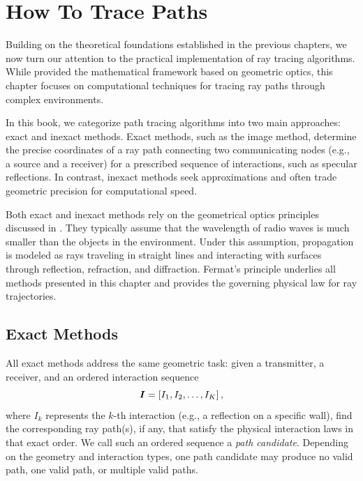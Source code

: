 \chapter{How To Trace Paths}

Building on the theoretical foundations established in the previous chapters, we now turn our attention to the practical implementation of ray tracing algorithms. While  provided the mathematical framework based on geometric optics, this chapter focuses on computational techniques for tracing ray paths through complex environments.

In this book, we categorize path tracing algorithms into two main approaches: exact and inexact methods. Exact methods, such as the image method, determine the precise coordinates of a ray path connecting two communicating nodes (e.g., a source and a receiver) for a prescribed sequence of interactions, such as specular reflections. In contrast, inexact methods seek approximations and often trade geometric precision for computational speed.

Both exact and inexact methods rely on the geometrical optics principles discussed in . They typically assume that the \gls{wavelength} of radio waves is much smaller than the objects in the environment. Under this assumption, propagation is modeled as rays traveling in straight lines and interacting with surfaces through reflection, refraction, and diffraction. Fermat's principle underlies all methods presented in this chapter and provides the governing physical law for ray trajectories.

\section{Exact Methods}

All exact methods address the same geometric task: given a transmitter, a receiver, and an ordered interaction sequence
\begin{equation}
  \boldsymbol{I} = \left[I_1, I_2, \ldots, I_{K}\right],
\end{equation}
where $I_k$ represents the $k$-th interaction (e.g., a reflection on a specific wall), find the corresponding ray path(s), if any, that satisfy the physical interaction laws in that exact order. We call such an ordered sequence a \emph{path candidate}. Depending on the geometry and interaction types, one path candidate may produce no valid path, one valid path, or multiple valid paths.

